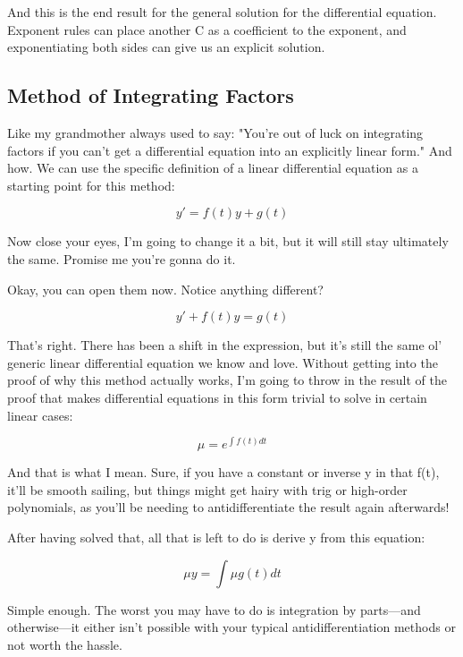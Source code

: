 \documentclass[10pt]{extarticle}
\begin{document}
\begin{multicols}{2}
And this is the end result for the general solution for the differential
equation. Exponent rules can place another C as a coefficient to the exponent,
and exponentiating both sides can give us an explicit solution.


\subsection{Method of Integrating Factors}

Like my grandmother always used to say: "You're out of luck on integrating
factors if you can't get a differential equation into an explicitly linear
form." And how. We can use the specific definition of a linear differential
equation as a starting point for this method:

\begin{equation*}
    y' = f(t)y + g(t) 
\end{equation*}

Now close your eyes, I'm going to change it a bit, but it will still stay
ultimately the same. Promise me you're gonna do it.

Okay, you can open them now. Notice anything different?

\begin{equation*}
    y' + f(t)y = g(t) 
\end{equation*}

That's right. There has been a shift in the expression,
but it's still the same ol' generic linear differential equation we
know and love. Without getting into the proof of why this method actually
works, I'm going to throw in the result of the proof that makes differential
equations in this form trivial to solve in certain linear cases:

\begin{equation*}
    \mu = e^{\int{}f(t)dt}
\end{equation*}

And that is what I mean. Sure, if you have a constant or inverse y in that
f(t), it'll be smooth sailing, but things might get hairy with trig or
high-order polynomials, as you'll be needing to antidifferentiate the result
again afterwards!

After having solved that, all that is left to do is derive y from this
equation:

\begin{equation*}
    \mu y = \int \mu g(t) dt
\end{equation*}

Simple enough. The worst you may have to do is integration by parts---and
otherwise---it either isn't possible with your typical antidifferentiation
methods or not worth the hassle.


\end{multicols}
\end{document}
